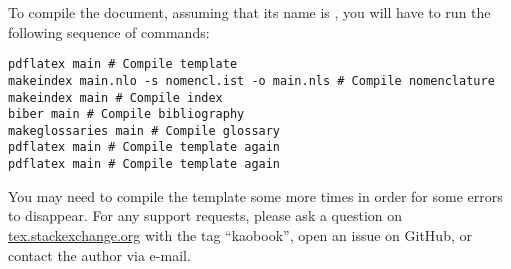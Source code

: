To compile the document, assuming that its name is , you
will have to run the following sequence of commands:

\begin{lstlisting}[style=kaolstplain,linewidth=1.5\textwidth]
pdflatex main # Compile template
makeindex main.nlo -s nomencl.ist -o main.nls # Compile nomenclature
makeindex main # Compile index
biber main # Compile bibliography
makeglossaries main # Compile glossary
pdflatex main # Compile template again
pdflatex main # Compile template again
\end{lstlisting}

You may need to compile the template some more times in order for some
errors to disappear. For any support requests, please ask a question on
\url{tex.stackexchange.org} with the tag \enquote{kaobook}, open an
issue on GitHub, or contact the author via e-mail.
